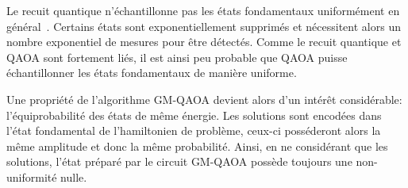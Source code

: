Le recuit quantique n'échantillonne pas les états fondamentaux uniformément en général~\cite{matsudaGroundstateStatisticsAnnealing2009, mandraExponentiallyBiasedGroundState2017}. Certains états sont exponentiellement supprimés et nécessitent alors un nombre exponentiel de mesures pour être détectés. Comme le recuit quantique et QAOA sont fortement liés, il est ainsi peu probable que QAOA puisse échantillonner les états fondamentaux de manière uniforme.

Une propriété de l'algorithme GM-QAOA devient alors d'un intérêt considérable: l'équiprobabilité des états de même énergie. Les solutions sont encodées dans l'état fondamental de l'hamiltonien de problème, ceux-ci posséderont alors la même amplitude et donc la même probabilité. Ainsi, en ne considérant que les solutions, l'état préparé par le circuit GM-QAOA possède toujours une non-uniformité nulle. 
